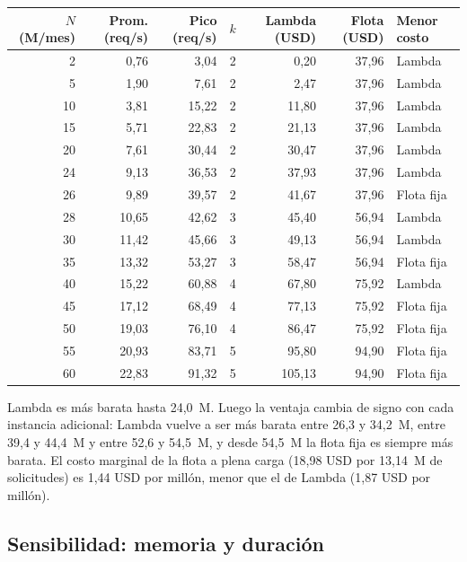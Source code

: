\documentclass[12pt, letterpaper, table, xcdraw]{inf-pucv}
\begin{document}
{\small\setlength{\tabcolsep}{3.5pt}
\begin{center}
\begin{tabular}{|r|r|r|r|r|r|l|}
\hline
\textbf{$N$ (M/mes)} & \textbf{Prom. (req/s)} & \textbf{Pico (req/s)} & \textbf{$k$} & \textbf{Lambda (USD)} & \textbf{Flota (USD)} & \textbf{Menor costo} \\ \hline
2 & 0,76 & 3,04 & 2 & 0,20 & 37,96 & Lambda \\ \hline
5 & 1,90 & 7,61 & 2 & 2,47 & 37,96 & Lambda \\ \hline
10 & 3,81 & 15,22 & 2 & 11,80 & 37,96 & Lambda \\ \hline
15 & 5,71 & 22,83 & 2 & 21,13 & 37,96 & Lambda \\ \hline
20 & 7,61 & 30,44 & 2 & 30,47 & 37,96 & Lambda \\ \hline
24 & 9,13 & 36,53 & 2 & 37,93 & 37,96 & Lambda \\ \hline
26 & 9,89 & 39,57 & 2 & 41,67 & 37,96 & Flota fija \\ \hline
28 & 10,65 & 42,62 & 3 & 45,40 & 56,94 & Lambda \\ \hline
30 & 11,42 & 45,66 & 3 & 49,13 & 56,94 & Lambda \\ \hline
35 & 13,32 & 53,27 & 3 & 58,47 & 56,94 & Flota fija \\ \hline
40 & 15,22 & 60,88 & 4 & 67,80 & 75,92 & Lambda \\ \hline
45 & 17,12 & 68,49 & 4 & 77,13 & 75,92 & Flota fija \\ \hline
50 & 19,03 & 76,10 & 4 & 86,47 & 75,92 & Flota fija \\ \hline
55 & 20,93 & 83,71 & 5 & 95,80 & 94,90 & Flota fija \\ \hline
60 & 22,83 & 91,32 & 5 & 105,13 & 94,90 & Flota fija \\ \hline
\end{tabular}
\end{center}
}

Lambda es más barata hasta 24,0~M. Luego la ventaja cambia de signo con cada instancia adicional: Lambda vuelve a ser más barata entre 26,3 y 34,2~M, entre 39,4 y 44,4~M y entre 52,6 y 54,5~M, y desde 54,5~M la flota fija es siempre más barata. El costo marginal de la flota a plena carga (18,98 USD por 13,14~M de solicitudes) es 1,44 USD por millón, menor que el de Lambda (1,87 USD por millón).

\subsection*{Sensibilidad: memoria y duración}
\end{document}
